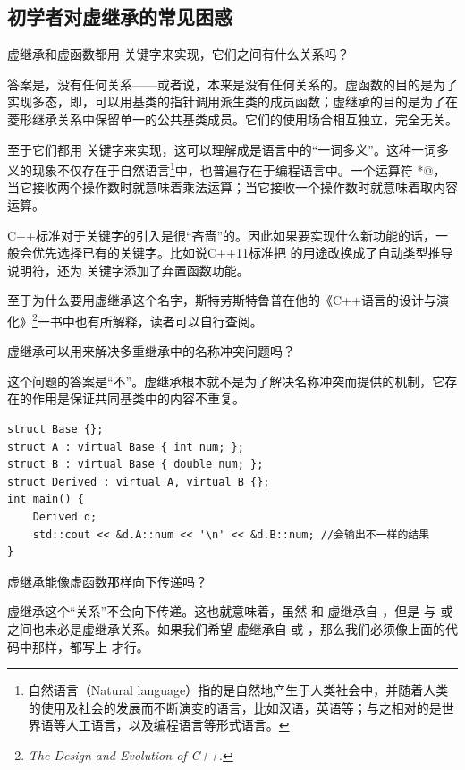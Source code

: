 \subsection*{初学者对虚继承的常见困惑}
{\kaishu 虚继承和虚函数都用 \lstinline@virtual@ 关键字来实现，它们之间有什么关系吗？}\par
答案是，没有任何关系——或者说，本来是没有任何关系的。虚函数的目的是为了实现多态，即，可以用基类的指针调用派生类的成员函数；虚继承的目的是为了在菱形继承关系中保留单一的公共基类成员。它们的使用场合相互独立，完全无关。\par
至于它们都用 \lstinline@virtual@ 关键字来实现，这可以理解成是语言中的``一词多义''。这种一词多义的现象不仅存在于自然语言\footnote{自然语言（Natural language）指的是自然地产生于人类社会中，并随着人类的使用及社会的发展而不断演变的语言，比如汉语，英语等；与之相对的是世界语等人工语言，以及编程语言等形式语言。}中，也普遍存在于编程语言中。一个运算符 \lstinline@*@，当它接收两个操作数时就意味着乘法运算；当它接收一个操作数时就意味着取内容运算。\par
C++标准对于关键字的引入是很``吝啬''的。因此如果要实现什么新功能的话，一般会优先选择已有的关键字。比如说C++11标准把 \lstinline@auto@ 的用途改换成了自动类型推导说明符，还为 \lstinline@delete@ 关键字添加了弃置函数功能。\par
至于为什么要用虚继承这个名字，斯特劳斯特鲁普在他的《C++语言的设计与演化》\footnote{\textit{The Design and Evolution of C++}.}一书中也有所解释，读者可以自行查阅。\par
{\kaishu 虚继承可以用来解决多重继承中的名称冲突问题吗？}\par
这个问题的答案是``不''。虚继承根本就不是为了解决名称冲突而提供的机制，它存在的作用是保证共同基类中的内容不重复。
\begin{lstlisting}
struct Base {};
struct A : virtual Base { int num; };
struct B : virtual Base { double num; };
struct Derived : virtual A, virtual B {};
int main() {
    Derived d;
    std::cout << &d.A::num << '\n' << &d.B::num; //会输出不一样的结果
}
\end{lstlisting}\par
{\kaishu 虚继承能像虚函数那样向下传递吗？}\par
虚继承这个``关系''不会向下传递。这也就意味着，虽然 \lstinline@A@ 和 \lstinline@B@ 虚继承自 \lstinline@Base@，但是 \lstinline@Derived@ 与 \lstinline@A@ 或 \lstinline@B@ 之间也未必是虚继承关系。如果我们希望 \lstinline@Derived@ 虚继承自 \lstinline@A@ 或 \lstinline@B@，那么我们必须像上面的代码中那样，都写上 \lstinline@virtual@ 才行。\par
